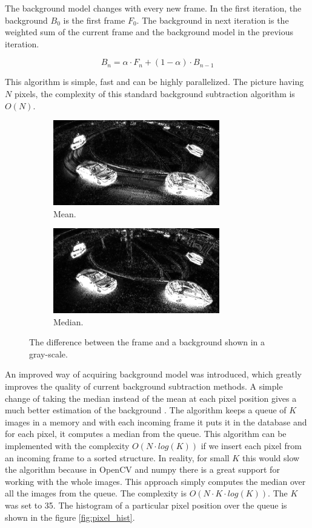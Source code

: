 \documentclass[a4paper,11pt,titlepage,twoside]{article}
\numberwithin{figure}{section}
\begin{document}
The background model changes with every new frame. In the first iteration, the background $B_0$ is the first frame $F_0$. The background in next iteration is the weighted sum of the  current frame and the background model in the previous iteration.

\begin{equation}
B_n = \alpha \cdot F_n + (1 - \alpha) \cdot B_{n-1}
\end{equation}

This algorithm is simple, fast and can be highly parallelized. The picture having $N$  pixels, the complexity of this standard background subtraction algorithm is  $O(N)$.



\begin{figure}
    \begin{subfigure}[Sample1]{0.5\linewidth}
        \includegraphics[height=37mm]{fig/threshold_mean_crop.png}
        \caption{Mean.}
        \label{fig:threshold_mean}
    \end{subfigure}
    \qquad
    \begin{subfigure}[Sample1]{0.5\linewidth}    
        \includegraphics[height=37mm]{fig/threshold_med_crop.png}
        \caption{Median.}
        \label{fig:threshold_med}    
    \end{subfigure} 
    \caption{The difference between the frame and a background shown in a gray-scale.}
\end{figure}

An improved way of acquiring background model was introduced, which greatly improves the quality of current background subtraction methods. A simple change of taking the median instead of the mean at each pixel position gives a much better estimation of the background \cite{bgs-med1, bgs-med2}. The algorithm keeps a queue of $K$ images in a memory and with each incoming frame it puts it in the database and for each pixel, it computes a median from the queue. This algorithm can be implemented with the complexity $O(N \cdot log(K))$ if we insert each pixel from an incoming frame to a sorted structure. In reality, for small $K$ this would slow the algorithm because in OpenCV and numpy there is a great support for working with the whole images. This approach simply computes the median over all the images from the queue. The complexity is $O(N \cdot K \cdot log(K)).$ The $K$ was set to 35. The histogram of a particular pixel position over the queue is shown in the figure \ref{fig:pixel_hist}.
\end{document}
